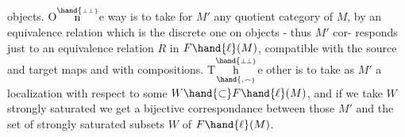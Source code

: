 objects. O$\overset{\hand{\scriptscriptstyle\perp\perp}}{\mathrm n}$e way is to take for $M'$ any quotient category of $M$, by an
equivalence relation which is the discrete one on objects - thus $M'$ cor-%
responds just to an equivalence relation $R$ in $F\hand{\ell}(M)$, compatible with
 the source and target maps and with compositions. T$\overset{\hand{\scriptscriptstyle\perp\perp}}{\underset{\hand{\scriptscriptstyle,\frown}}{\mathrm h}}$e other is
to take as $M'$ a localization with respect to some $W\hand{\subset}F\hand{\ell}(M)$, and if we
take $W$ strongly saturated we get a bijective correspondance between those
$M'$ and the  set of strongly saturated subsets $W$ of $F\hand{\ell}(M)$.

